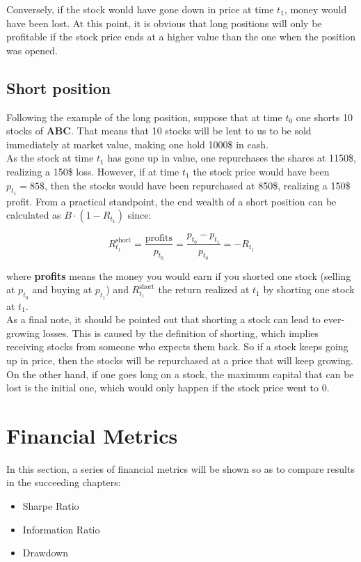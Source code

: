 Conversely, if the stock would have gone down in price at time $t_1$, money 
would have been lost. At this point, it is obvious that long positions will 
only be profitable if the stock price ends at a higher value than the one 
when the position was opened.

\subsection*{Short position}
Following the example of the long position, suppose that at time $t_0$ one 
shorts 10 stocks of \textbf{ABC}. That means that 10 stocks will be lent to 
us to be sold immediately at market value, making one hold 1000\$ in cash.\\

As the stock at time $t_1$ has gone up in value, one repurchases the shares 
at 1150\$, realizing a 150\$ loss. However, if at time $t_1$ the stock price 
would have been $p_{t_1} = 85\$ $, then the stocks would have been 
repurchased at 850\$, realizing a 150\$ profit. From a practical standpoint, 
the end wealth of a short position can be calculated as 
$B \cdot (1 - R_{t_1})$ since:

\begin{equation*}
	R_{t_1}^{\text{short}} = \frac{\text{profits}}{p_{t_0}} =  
	\frac{p_{t_0} - p_{t_1}}{p_{t_0}} = - R_{t_1}
\end{equation*}

where \textbf{profits} means the money you would earn if you shorted one 
stock (selling at $p_{t_0}$ and buying at $p_{t_1}$) and 
$R_{t_1}^{\text{short}}$ the return realized at $t_1$ by shorting one stock 
at $t_1$.\\

As a final note, it should be pointed out that shorting a stock can lead to 
ever-growing losses. This is caused by the definition of shorting, which 
implies receiving stocks from someone who expects them back. So if a stock 
keeps going up in price, then the stocks will be repurchased at a price that 
will keep growing. On the other hand, if one goes long on a stock, the 
maximum capital that can be lost is the initial one, which would only happen 
if the stock price went to 0.

\section{Financial Metrics}
In this section, a series of financial metrics will be shown so as to 
compare results in the succeeding chapters:
\begin{itemize}
	\item Sharpe Ratio
	\item Information Ratio
	\item Drawdown
\end{itemize}

